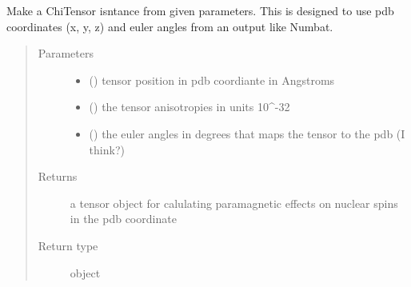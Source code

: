 \documentclass[a4paper,10pt,english,openany,oneside]{sphinxmanual}
\begin{document}
\begin{fulllineitems}
\label{\detokenize{reference/generated/paramagpy.metal.make_tensor:paramagpy.metal.make_tensor}}
Make a ChiTensor isntance from given parameters.
This is designed to use pdb coordinates (x, y, z) and euler angles
from an output like Numbat.
\begin{quote}\begin{description}
\item[{Parameters}] \leavevmode\begin{itemize}
\item {} 
\sphinxstyleliteralstrong{\sphinxupquote{, }} (\sphinxstyleliteralemphasis{\sphinxupquote{,}}) \textendash{} tensor position in pdb coordiante in Angstroms

\item {} 
 (\sphinxstyleliteralemphasis{\sphinxupquote{,}}) \textendash{} the tensor anisotropies in units 10\textasciicircum{}-32

\item {} 
\sphinxstyleliteralstrong{\sphinxupquote{, }} (\sphinxstyleliteralemphasis{\sphinxupquote{,}}) \textendash{} the euler angles in degrees that maps the tensor
to the pdb (I think?)

\end{itemize}

\item[{Returns}] \leavevmode
{} \textendash{} a tensor object for calulating paramagnetic effects on
nuclear spins in the pdb coordinate

\item[{Return type}] \leavevmode
object {\hyperref[\detokenize{reference/generated/paramagpy.metal.Metal:paramagpy.metal.Metal}]{}}

\end{description}\end{quote}

\end{fulllineitems}
\end{document}
